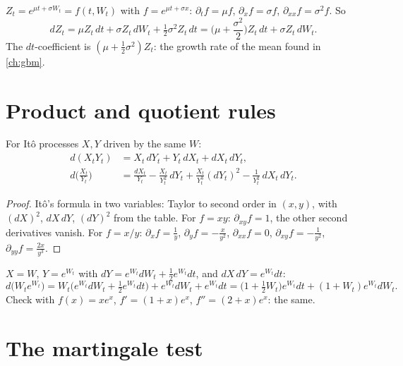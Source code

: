 \begin{example}
\label{ex:ito-gbm}
$Z_t=e^{\mu t+\sigma W_t}=f(t,W_t)$ with $f=e^{\mu t+\sigma x}$: $\partial_tf=\mu f$, $\partial_xf=\sigma f$, $\partial_{xx}f=\sigma^2f$. So
\[
  dZ_t=\mu Z_t\,dt+\sigma Z_t\,dW_t+\tfrac12\sigma^2Z_t\,dt=\Big(\mu+\frac{\sigma^2}2\Big)Z_t\,dt+\sigma Z_t\,dW_t .
\]
The $dt$-coefficient is $(\mu+\frac12\sigma^2)Z_t$: the growth rate of the mean found in \cref{ch:gbm}.
\end{example}

\section{Product and quotient rules}

\begin{result}
\label{res:product}
For Itô processes $X,Y$ driven by the same $W$:
\[
  \begin{aligned}
  d(X_tY_t)&=X_t\,dY_t+Y_t\,dX_t+dX_t\,dY_t,\\
  d\Big(\frac{X_t}{Y_t}\Big)&=\frac{dX_t}{Y_t}-\frac{X_t}{Y_t^2}\,dY_t+\frac{X_t}{Y_t^3}(dY_t)^2-\frac{1}{Y_t^2}\,dX_t\,dY_t .
  \end{aligned}
\]
\end{result}
\begin{proof}
Itô's formula in two variables: Taylor to second order in $(x,y)$, with $(dX)^2$, $dX\,dY$, $(dY)^2$ from the table. For $f=xy$: $\partial_{xy}f=1$, the other second derivatives vanish. For $f=x/y$: $\partial_xf=\frac1y$, $\partial_yf=-\frac x{y^2}$, $\partial_{xx}f=0$, $\partial_{xy}f=-\frac1{y^2}$, $\partial_{yy}f=\frac{2x}{y^3}$.
\end{proof}

\begin{example}
$X=W$, $Y=e^{W_t}$ with $dY=e^{W_t}dW_t+\frac12e^{W_t}dt$, and $dX\,dY=e^{W_t}dt$:
\[
  d\big(W_te^{W_t}\big)=W_t\Big(e^{W_t}dW_t+\tfrac12e^{W_t}dt\Big)+e^{W_t}dW_t+e^{W_t}dt=\Big(1+\tfrac12W_t\Big)e^{W_t}dt+(1+W_t)e^{W_t}dW_t .
\]
Check with $f(x)=xe^x$, $f'=(1+x)e^x$, $f''=(2+x)e^x$: the same.
\end{example}

\section{The martingale test}

